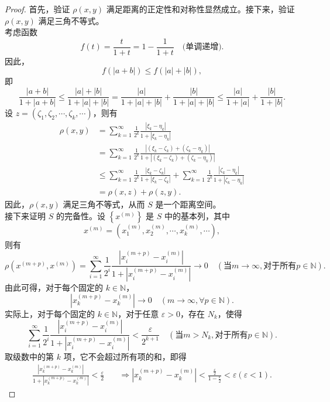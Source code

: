 \documentclass[lang=cn,newtx,10pt,scheme=chinese,thmcnt=chapter]{elegantbook}
\begin{document}
\begin{proof}
首先，验证 \( \rho(x, y) \) 满足距离的正定性和对称性显然成立。接下来，验证 \( \rho(x, y) \) 满足三角不等式。\\
考虑函数
\[
f(t) = \frac{t}{1+t} = 1 - \frac{1}{1+t} \quad \text{(单调递增)}.
\]
因此，
\[
f(|a+b|) \leqslant f(|a| + |b|),
\]
即
\[
\frac{|a+b|}{1 + |a+b|} \leqslant \frac{|a| + |b|}{1 + |a| + |b|} = \frac{|a|}{1 + |a| + |b|} + \frac{|b|}{1 + |a| + |b|} \leqslant \frac{|a|}{1 + |a|} + \frac{|b|}{1 + |b|}.
\]
设 \( z = \left(\zeta_1, \zeta_2, \cdots, \zeta_k, \cdots\right) \)，则有
\[
\begin{aligned}
\rho(x, y) &= \sum_{k=1}^{\infty} \frac{1}{2^k} \frac{\left|\xi_k - \eta_k\right|}{1 + \left|\xi_k - \eta_k\right|} \\
&= \sum_{k=1}^{\infty} \frac{1}{2^k} \frac{\left|(\xi_k - \zeta_k) + (\zeta_k - \eta_k)\right|}{1 + \left|(\xi_k - \zeta_k) + (\zeta_k - \eta_k)\right|} \\
&\leqslant \sum_{k=1}^{\infty} \frac{1}{2^k} \frac{\left|\xi_k - \zeta_k\right|}{1 + \left|\xi_k - \zeta_k\right|} + \sum_{k=1}^{\infty} \frac{1}{2^k} \frac{\left|\zeta_k - \eta_k\right|}{1 + \left|\zeta_k - \eta_k\right|} \\
&= \rho(x, z) + \rho(z, y).
\end{aligned}
\]
因此，\( \rho(x, y) \) 满足三角不等式，从而 \( S \) 是一个距离空间。\\
接下来证明 \( S \) 的完备性。设 \( \left\{x^{(m)}\right\} \) 是 \( S \) 中的基本列，其中
\[
x^{(m)} = \left(x_1^{(m)}, x_2^{(m)}, \cdots, x_k^{(m)}, \cdots\right),
\]
则有
\[
\rho\left(x^{(m+p)}, x^{(m)}\right) = \sum_{i=1}^{\infty} \frac{1}{2^i} \frac{\left|x_i^{(m+p)} - x_i^{(m)}\right|}{1 + \left|x_i^{(m+p)} - x_i^{(m)}\right|} \to 0 \quad (\text{当}  m \to \infty , \text{对于所有}  p \in \mathbb{N} ).
\]
由此可得，对于每个固定的 \( k \in \mathbb{N} \)，
\[
\left|x_k^{(m+p)} - x_k^{(m)}\right| \to 0 \quad (m \to \infty, \forall p \in \mathbb{N}).
\]
实际上，对于每个固定的 \( k \in \mathbb{N} \)，对于任意 \( \varepsilon > 0 \)，存在 \( N_k \)，使得
\[
\sum_{i=1}^{\infty} \frac{1}{2^i} \frac{\left|x_i^{(m+p)} - x_i^{(m)}\right|}{1 + \left|x_i^{(m+p)} - x_i^{(m)}\right|} < \frac{\varepsilon}{2^{k+1}} \quad (\text{当}  m > N_k ,\text{对于所有}  p \in \mathbb{N} ).
\]
取级数中的第 \( k \) 项，它不会超过所有项的和，即得
\[
\begin{aligned}
\frac{\left|x_k^{(m+p)} - x_k^{(m)}\right|}{1 + \left|x_k^{(m+p)} - x_k^{(m)}\right|} < \frac{\varepsilon}{2} \quad &\Longrightarrow \left|x_k^{(m+p)} - x_k^{(m)}\right| < \frac{\frac{\varepsilon}{2}}{1 - \frac{\varepsilon}{2}} <\varepsilon(\varepsilon<1).

\end{aligned}\]
\end{proof}
\end{document}

